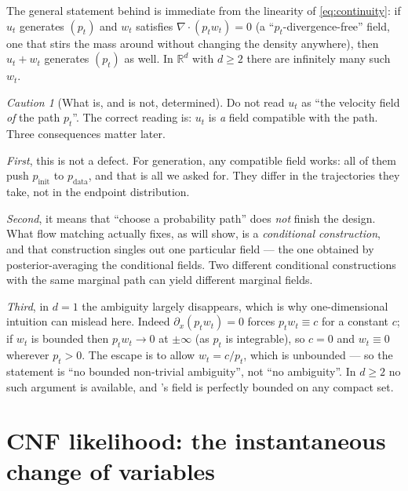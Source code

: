 \documentclass[11pt,a4paper]{report}
\theoremstyle{definition}
\theoremstyle{remark}
\newtheorem{caution}[caution]{Caution}
\newcommand{\RR}{\mathbb R}
\begin{document}
The general statement behind  is immediate from the
linearity of \eqref{eq:continuity}: if $u_t$ generates $(p_t)$ and $w_t$
satisfies $\nabla\cdot(p_tw_t)=0$ (a ``$p_t$-divergence-free'' field, one
that stirs the mass around without changing the density anywhere), then
$u_t+w_t$ generates $(p_t)$ as well. In $\RR^d$ with $d\ge2$ there are
infinitely many such $w_t$.

\begin{caution}[What is, and is not, determined]
\label{caution:vf-nonunique}
Do not read $u_t$ as ``the velocity field \emph{of} the path $p_t$''. The
correct reading is: $u_t$ is \emph{a} field compatible with the path. Three
consequences matter later.

\emph{First}, this is not a defect. For generation, any compatible field
works: all of them push $p_{\mathrm{init}}$ to $p_{\mathrm{data}}$, and
that is all we asked for. They differ in the trajectories they take, not
in the endpoint distribution.

\emph{Second}, it means that ``choose a probability path'' does \emph{not}
finish the design. What flow matching actually fixes, as
 will show, is a \emph{conditional construction}, and
that construction singles out one particular field --- the one obtained by
posterior-averaging the conditional fields. Two different conditional
constructions with the same marginal path can yield different marginal
fields.

\emph{Third}, in $d=1$ the ambiguity largely disappears, which is why
one-dimensional intuition can mislead here. Indeed $\partial_x(p_tw_t)=0$
forces $p_tw_t\equiv c$ for a constant $c$; if $w_t$ is bounded then
$p_tw_t\to0$ at $\pm\infty$ (as $p_t$ is integrable), so $c=0$ and
$w_t\equiv0$ wherever $p_t>0$. The escape is to allow $w_t=c/p_t$, which is
unbounded --- so the statement is ``no bounded non-trivial ambiguity'',
not ``no ambiguity''. In $d\ge2$ no such argument is available, and
's field is perfectly bounded on any compact set.
\end{caution}

\section{CNF likelihood: the instantaneous change of variables}
\label{sec:cnf-likelihood}
\end{document}
